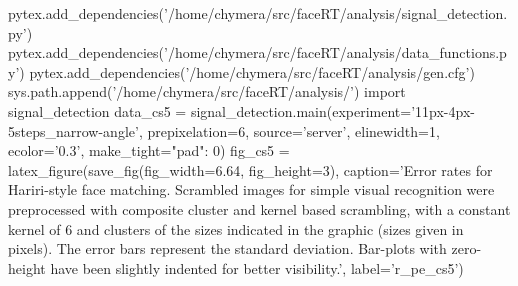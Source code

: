 \begin{pycode}
pytex.add_dependencies('/home/chymera/src/faceRT/analysis/signal_detection.py')
pytex.add_dependencies('/home/chymera/src/faceRT/analysis/data_functions.py')
pytex.add_dependencies('/home/chymera/src/faceRT/analysis/gen.cfg')
sys.path.append('/home/chymera/src/faceRT/analysis/')
import signal_detection
data_cs5 = signal_detection.main(experiment='11px-4px-5steps_narrow-angle', prepixelation=6, source='server', elinewidth=1, ecolor='0.3', make_tight={"pad": 0})
fig_cs5 = latex_figure(save_fig(fig_width=6.64, fig_height=3), caption='Error rates for Hariri-style face matching. Scrambled images for simple visual recognition were preprocessed with composite cluster and kernel based scrambling, with a constant kernel of \SI{6}{\pixel} and clusters of the sizes indicated in the graphic (sizes given in pixels). The error bars represent the standard deviation. Bar-plots with zero-height have been slightly indented for better visibility.', label='r_pe_cs5')
\end{pycode}
